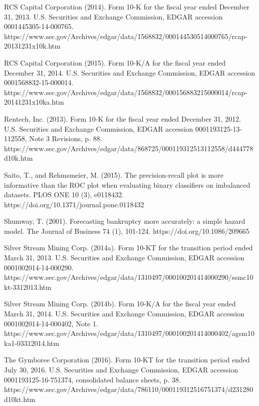 \documentclass[10pt,a4paper,twocolumn]{article}
\begin{document}
\noindent RCS Capital Corporation (2014). Form 10-K for the fiscal year ended December 31, 2013. U.S. Securities and Exchange Commission, EDGAR accession 0001445305-14-000765. https://www.sec.gov/Archives/edgar/data/1568832/000144530514000765/rcap-20131231x10k.htm\par\vspace{2pt}
\noindent RCS Capital Corporation (2015). Form 10-K/A for the fiscal year ended December 31, 2014. U.S. Securities and Exchange Commission, EDGAR accession 0001568832-15-000014. https://www.sec.gov/Archives/edgar/data/1568832/000156883215000014/rcap-20141231x10ka.htm\par\vspace{2pt}
\noindent Rentech, Inc. (2013). Form 10-K for the fiscal year ended December 31, 2012. U.S. Securities and Exchange Commission, EDGAR accession 0001193125-13-112558, Note 3 Revisions, p. 88. https://www.sec.gov/Archives/edgar/data/868725/000119312513112558/d444778d10k.htm\par\vspace{2pt}
\noindent Saito, T., and Rehmsmeier, M. (2015). The precision-recall plot is more informative than the ROC plot when evaluating binary classifiers on imbalanced datasets. PLOS ONE 10 (3), e0118432. https://doi.org/10.1371/journal.pone.0118432\par\vspace{2pt}
\noindent Shumway, T. (2001). Forecasting bankruptcy more accurately: a simple hazard model. The Journal of Business 74 (1), 101-124. https://doi.org/10.1086/209665\par\vspace{2pt}
\noindent Silver Stream Mining Corp. (2014a). Form 10-KT for the transition period ended March 31, 2013. U.S. Securities and Exchange Commission, EDGAR accession 0001002014-14-000290. https://www.sec.gov/Archives/edgar/data/1310497/000100201414000290/ssmc10kt-3312013.htm\par\vspace{2pt}
\noindent Silver Stream Mining Corp. (2014b). Form 10-K/A for the fiscal year ended March 31, 2014. U.S. Securities and Exchange Commission, EDGAR accession 0001002014-14-000402, Note 1. https://www.sec.gov/Archives/edgar/data/1310497/000100201414000402/agsm10ka1-03312014.htm\par\vspace{2pt}
\noindent The Gymboree Corporation (2016). Form 10-KT for the transition period ended July 30, 2016. U.S. Securities and Exchange Commission, EDGAR accession 0001193125-16-751374, consolidated balance sheets, p. 38. https://www.sec.gov/Archives/edgar/data/786110/000119312516751374/d231280d10kt.htm\par\vspace{2pt}
\end{document}
